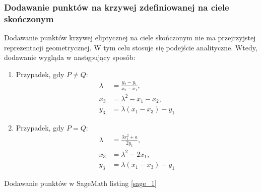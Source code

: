 \subsubsection{Dodawanie punktów na krzywej zdefiniowanej na ciele skończonym}
Dodawanie punktów krzywej eliptycznej na ciele skończonym nie ma przejrzyjstej
reprezentacji geometrycznej.
W tym celu stosuje się podejście analityczne.
Wtedy, dodawanie wygląda w następujący sposób:
\begin{enumerate}
    \item Przypadek, gdy \( P \neq Q \):
          \begin{align*}
              \lambda & = \frac{y_2 - y_1}{x_2 - x_1}, \\
              x_3     & = \lambda^2 - x_1 - x_2,       \\
              y_3     & = \lambda(x_1 - x_3) - y_1
          \end{align*}

    \item Przypadek, gdy \( P = Q \):
          \begin{align*}
              \lambda & = \frac{3x_1^2 + a}{2y_1}, \\
              x_3     & = \lambda^2 - 2x_1,        \\
              y_3     & = \lambda(x_1 - x_3) - y_1
          \end{align*}
\end{enumerate}
Dodawanie punktów w SageMath listing \ref{sage_1}

